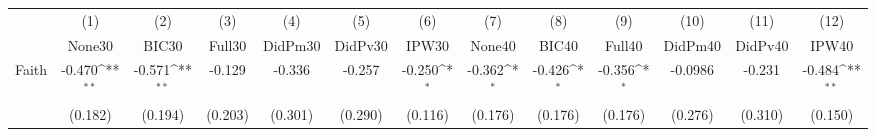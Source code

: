 {
\def\sym#1{\ifmmode^{#1}\else\(^{#1}\)\fi}
\begin{tabular}{l*{12}{c}}
\toprule
            &\multicolumn{1}{c}{(1)}&\multicolumn{1}{c}{(2)}&\multicolumn{1}{c}{(3)}&\multicolumn{1}{c}{(4)}&\multicolumn{1}{c}{(5)}&\multicolumn{1}{c}{(6)}&\multicolumn{1}{c}{(7)}&\multicolumn{1}{c}{(8)}&\multicolumn{1}{c}{(9)}&\multicolumn{1}{c}{(10)}&\multicolumn{1}{c}{(11)}&\multicolumn{1}{c}{(12)}\\
            &\multicolumn{1}{c}{None30}&\multicolumn{1}{c}{BIC30}&\multicolumn{1}{c}{Full30}&\multicolumn{1}{c}{DidPm30}&\multicolumn{1}{c}{DidPv30}&\multicolumn{1}{c}{IPW30}&\multicolumn{1}{c}{None40}&\multicolumn{1}{c}{BIC40}&\multicolumn{1}{c}{Full40}&\multicolumn{1}{c}{DidPm40}&\multicolumn{1}{c}{DidPv40}&\multicolumn{1}{c}{IPW40}\\
\midrule
Faith       &      -0.470\sym{**} &      -0.571\sym{**} &      -0.129         &      -0.336         &      -0.257         &      -0.250\sym{*}  &      -0.362\sym{*}  &      -0.426\sym{*}  &      -0.356\sym{*}  &     -0.0986         &      -0.231         &      -0.484\sym{**} \\
            &     (0.182)         &     (0.194)         &     (0.203)         &     (0.301)         &     (0.290)         &     (0.116)         &     (0.176)         &     (0.176)         &     (0.176)         &     (0.276)         &     (0.310)         &     (0.150)         \\
\bottomrule
\end{tabular}
}
